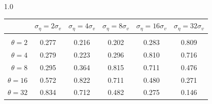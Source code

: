 \documentclass[12pt]{article}
\begin{document}
\begin{table}[h!]
\vspace{10pt}
\begin{subtable}{1.0\textwidth}
    \centering
\begin{tabular}{rccccc}
\hline  
            & \multicolumn{1}{l}{$\sigma_{\eta} =2\sigma_{v}$} & \multicolumn{1}{l}{$\sigma_{\eta} =4\sigma_{v}$} & \multicolumn{1}{l}{$\sigma_{\eta} =8\sigma_{v}$} & \multicolumn{1}{l}{$\sigma_{\eta} =16\sigma_{v}$} & \multicolumn{1}{l}{$\sigma_{\eta} =32\sigma_{v}$} \\ \hline  \vspace{-3mm} \\        
$\theta=2$  & 0.277                                             & 0.216                                             & 0.202                                             & 0.283                                              & 0.809                                              \\ \hline
$\theta=4$  & 0.279                                             & 0.223                                             & 0.296                                             & 0.810                                              & 0.716                                              \\ \hline
$\theta=8$  & 0.295                                             & 0.364                                             & 0.815                                             & 0.711                                              & 0.476                                              \\ \hline
$\theta=16$ & 0.572                                             & 0.822                                             & 0.711                                             & 0.480                                              & 0.271                                              \\ \hline
$\theta=32$ & 0.834                                             & 0.712                                             & 0.482                                             & 0.275                                              & 0.146                                              \\ \hline
\end{tabular}
\end{subtable}


\end{table}
\end{document}
